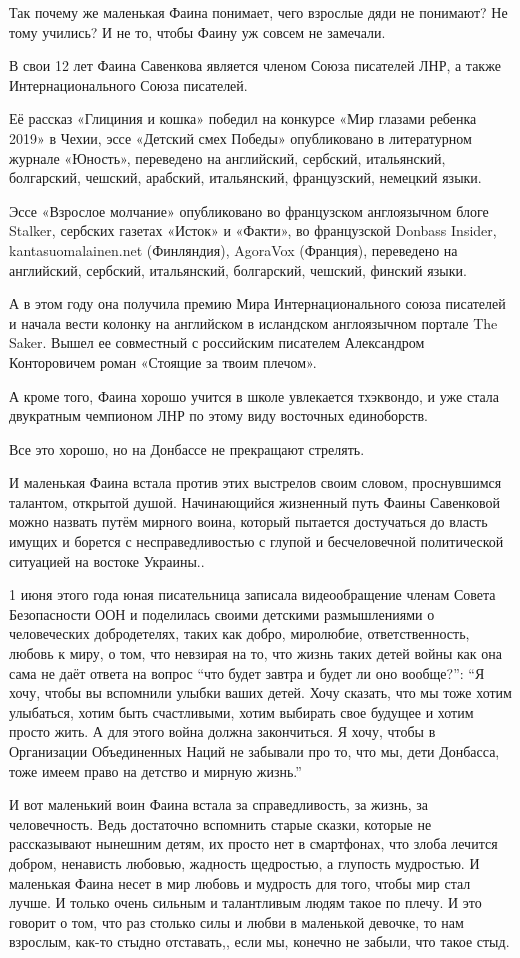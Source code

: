 Так почему же маленькая Фаина понимает, чего взрослые дяди не понимают? Не тому
учились? И не то, чтобы Фаину уж совсем не замечали.

В свои 12 лет Фаина Савенкова является членом Союза писателей ЛНР, а также
Интернационального Союза писателей.

Её рассказ «Глициния и кошка» победил на конкурсе «Мир глазами ребенка 2019» в
Чехии, эссе «Детский смех Победы» опубликовано в литературном журнале «Юность»,
переведено на английский, сербский, итальянский, болгарский, чешский, арабский,
итальянский, французский, немецкий языки.

Эссе «Взрослое молчание» опубликовано во французском англоязычном блоге
Stalker, сербских газетах «Исток» и «Факти», во французской Donbass Insider,
kantasuomalainen.net (Финляндия), AgoraVox (Франция), переведено на английский,
сербский, итальянский, болгарский, чешский, финский языки.

А в этом году она получила премию Мира Интернационального союза писателей и
начала вести колонку на английском в исландском англоязычном портале The Saker.
Вышел ее совместный с российским писателем Александром Конторовичем роман
«Стоящие за твоим плечом».

А кроме того, Фаина хорошо учится в школе увлекается тхэквондо, и уже стала
двукратным чемпионом ЛНР по этому виду восточных единоборств. 

Все это хорошо, но на Донбассе не прекращают стрелять. 

И маленькая Фаина встала против этих выстрелов своим словом, проснувшимся
талантом, открытой душой. Начинающийся жизненный путь Фаины Савенковой можно
назвать путём мирного воина, который пытается достучаться до власть имущих и
борется с несправедливостью с глупой и бесчеловечной политической ситуацией на
востоке Украины..

1 июня этого года юная писательница записала видеообращение членам Совета
Безопасности ООН и поделилась своими детскими размышлениями о человеческих
добродетелях, таких как добро, миролюбие, ответственность, любовь к миру, о
том, что невзирая на то, что жизнь таких детей войны как она сама не даёт
ответа на вопрос \enquote{что будет завтра и будет ли оно вообще?}: \enquote{Я хочу, чтобы вы
вспомнили улыбки ваших детей. Хочу сказать, что мы тоже хотим улыбаться, хотим
быть счастливыми, хотим выбирать свое будущее и хотим просто жить. А для этого
война должна закончиться. Я хочу, чтобы в Организации Объединенных Наций не
забывали про то, что мы, дети Донбасса, тоже имеем право на детство и мирную
жизнь.}

И вот маленький воин Фаина встала за справедливость, за жизнь, за человечность.
Ведь достаточно вспомнить старые сказки, которые не рассказывают нынешним
детям, их просто нет в смартфонах, что злоба лечится добром, ненависть любовью,
жадность щедростью, а глупость мудростью. И маленькая Фаина несет в мир любовь
и мудрость для того, чтобы мир стал лучше. И только очень сильным и талантливым
людям такое по плечу. И это говорит о том, что раз столько силы и любви в
маленькой девочке, то нам взрослым, как-то стыдно отставать,, если мы, конечно
не забыли, что такое стыд.

